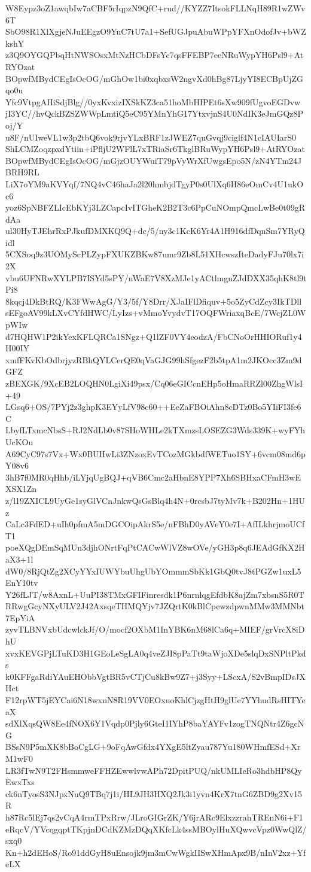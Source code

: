 W8Eypz3oZ1awqbIw7aCBF5rIqpzN9QfC+rud//KYZZ7ItsokFLLNqH89R1wZWv6T
SbO98R1XlXgjeNJuEEgzO9YuC7tU7a1+SefUGJpuAbuWPpYFXnOdofJv+bWZkshY
z3Q9OYGQPbqHtNWSOsxMtNzHCbDFsYc7qsFFEBP7eeNRuWypYH6Psl9+AtRYOzat
BOpwfMBydCEgIsOcOG/mGhOw1bi0xqbxsW2ngvXd0hBg87LjyYI8ECBpUjZGqo0u
Yfc9VtpgAHiSdjBlg//0yxKvxizIXSkKZ3ca51hoMbHIPEt6sXw909fUgvoEGDvw
jI3YC//hvQckBZSZWWpLmtiQ5eC95YMnYhG17YtxvjnS4U0NdIK3eJmGQz8Poj/Y
u8F/nUIweVL1w3p2tbQ6vok9rjvYLxBRF1zJWEZ7quGvqj9ciglf4N1cIAUIarS0
ShLCMZoqzpxdYtiin+iPfljU2WFlL7xTRiaSr6TkglBRuWypYH6Psl9+AtRYOzat
BOpwfMBydCEgIsOcOG/mGjzOUYWuiT79pVyWrXfUwgsEpo5N/zN4YTm24JBRH9RL
LiX7oYM9aKVYqf/7NQ4vC46haJa2l20hmbjdTgyP0s0UlXq6H86eOmCv4U1ukOc6
yoz6SpNBFZLIcEbKYj3LZCapcIvITGheK2B2T3c6PpCuNOmpQmcLwBe0t09gRdAa
ul30HyTJEhrRxPJkufDMXKQ9Q+dc/5/ny3c1KcK6Yr4A1H916dfDqnSm7YRyQidl
5CXSoq9z3UOMyScPLZypFXUKZBKw87umr9Zb8L51XHcwszIteDadyFJu70lx7i2X
vbu6UFNRwXYLPB7ISYd5sPY/nWaE7V8XzMJe1yACtlmgnZJdDXX35qhK8tl9tPi8
8kqcj4DkBtRQ/K3FWwAgG/Y3/5f/Y8Drr/XJaIFlDfiquv+5o5ZyCdZcy3IkTDll
sEFgoAV99kLXvCYfdHWC/LyIzs+vMmoYvydvT17OQFWriaxqBcE/7WcjZL0WpWIw
d7HQHW1P2ikYexKFLQRCa1SNgz+Q1lZF0VY4eodzA/FbCNoOrHHIORuf1y4H00IY
xmfFKvKbOdbrjyzRBhQYLCerQE0qVaGJG99hSfgezF2b5tpA1m2JKOcc3Zm9dGFZ
zBEXGK/9XcEB2LOQHN0LgiXi49psx/Cq06eGICcnEHp5oHmaRRZl00ZhgWlsI+49
LGsq6+OS/7PYj2z3ghpK3EYyLfV98c60++EeZaFBOiAhn8cDTz0Bo5YIiFI3fe6C
LbyfLTxmcNbsS+RJ2NdLb0v87SHoWHLe2kTXmzsLOSEZG3Wds339K+wyFYhUcKOu
A69CyC97s7Vx+Wx0BUHwLi3ZNzoxEvTCozMGkbdfWETuo1SY+6vcm08md6pY08v6
3hB7f0MR0qHhb/iLYjqUgBQJ+qVB6Cmc2aHbnE8YPP7Xh6SBHxaCFmH3wEXSX1Zn
z/l19ZXICL9UyGe1syGlVCnJnkwQsGsBlq4h4N+0rcsbJ7tyMv7k+B202Hn+1HUz
CaLc3FdED+uIh0pfmA5mDGCOipAkrS5e/nFBhD0yAVeY0e7I+AfILkhrjmoUCfT1
poeXQgDEmSqMUn3djhONrtFqPtCACwWlVZ8wOVe/yGH3p8q6JEAdGfKX2HaX3+1l
dW0/8RjQtZg2XCyYYxIUWYbuUhgUbYOmmmSbKk1GbQ0tvJ8tPGZw1uxL5EnY10tv
Y26fLJT/w8AxnL+UuPI38TMxGFIFinresdk1P6nrnlqgEfdbK8ajZm7xbsnS5R0T
RRwgGcyNXyULV2J42AxsqeTHMQYjv7JZQrtK0kBlCpewzdpwnMMw3MMNbt7EpYiA
zyvTLBNVxbUdcwlckJf/O/mocf2OXbM1InYBK6nM68lCa6q+MIEF/grVrcX8iDhU
xvxKEVGPjLTuKD3H1GEoLeSgLA0q4veZJI8pPaTt9taWjoXDe5slqDxSNPltPkds
k0KFFgaRdiYAuEHObbVgtBR5vCTjCu8kBw9Z7+j3Syy+LScxA/S2vBmpIDsJXHct
F12rpWT5jEYCai6N18wxnN8R19VV0EOxuoKhlCjzgHtH9glUe7YYhudRsHITYeaX
sdXlXqsQW8Ee4fNOX6Y1Vqdp0Pjly6GteI1IYhP8baYAYFv1zogTNQNtr4Z6gcNG
BSsN9P5mXK8bBoCgLG+9oFqAwGfdx4YXgE5ltZyau787Yu180WHmfESd+XrM1wF0
LR3fTwN9T2FHsmmweFFHZEwwlvwAPh72DpitPUQ/nkUMLIeRo3hdbHP8QyEwxTxs
ck6nTyosS3NJpxNuQ9TBq7j1i/HL9JH3HXQ2Jk3i1yvn4KrX7tnG6ZBD9g2Xv15R
h87Rc5lEj7qs2vCqA4rmTPxRrw/JLroGIGrZK/Y6jrARc9ElxzzrahTREnN6i+F1
eRqcV/YVcqgqptTKpjnDCdKZMzDQqXKfcLk4ssMBOylHuXQwvcVpz0WwQlZ/sxq0
Kn+h2dEHoS/Ro91ddGyH8uEnsojk9jm3mCwWgkIISwXHmApx9B/nInV2xz+YfeLX
